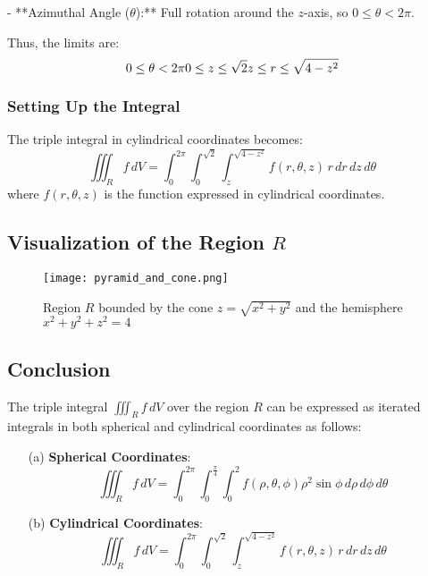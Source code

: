 \documentclass[11pt]{article}
\begin{document}
- **Azimuthal Angle (\( \theta \)):** Full rotation around the \( z \)-axis, so \( 0 \leq \theta < 2\pi \).

Thus, the limits are:
\[
0 \leq \theta < 2\pi \\
0 \leq z \leq \sqrt{2} \\
z \leq r \leq \sqrt{4 - z^2}
\]

\newpage

\subsubsection{Setting Up the Integral}

The triple integral in cylindrical coordinates becomes:
\[
\iiint_{R} f \, dV = \int_{0}^{2\pi} \int_{0}^{\sqrt{2}} \int_{z}^{\sqrt{4 - z^2}} f(r, \theta, z) \, r \, dr \, dz \, d\theta
\]
where \( f(r, \theta, z) \) is the function expressed in cylindrical coordinates.

\newpage

\subsection{Visualization of the Region \( R \)}

\begin{figure}[h]
    \centering
    \texttt{[image: pyramid\_and\_cone.png]} %
    \caption{Region \( R \) bounded by the cone \( z = \sqrt{x^2 + y^2} \) and the hemisphere \( x^2 + y^2 + z^2 = 4 \)}
\end{figure}

\newpage

\subsection{Conclusion}

The triple integral \( \iiint_{R} f \, dV \) over the region \( R \) can be expressed as iterated integrals in both spherical and cylindrical coordinates as follows:

\begin{enumerate}
    \item[(a)] \textbf{Spherical Coordinates}:
    \[
    \iiint_{R} f \, dV = \int_{0}^{2\pi} \int_{0}^{\frac{\pi}{4}} \int_{0}^{2} f(\rho, \theta, \phi) \rho^2 \sin\phi \, d\rho \, d\phi \, d\theta
    \]
    
    \item[(b)] \textbf{Cylindrical Coordinates}:
    \[
    \iiint_{R} f \, dV = \int_{0}^{2\pi} \int_{0}^{\sqrt{2}} \int_{z}^{\sqrt{4 - z^2}} f(r, \theta, z) \, r \, dr \, dz \, d\theta
    \]
\end{enumerate}
\end{document}
